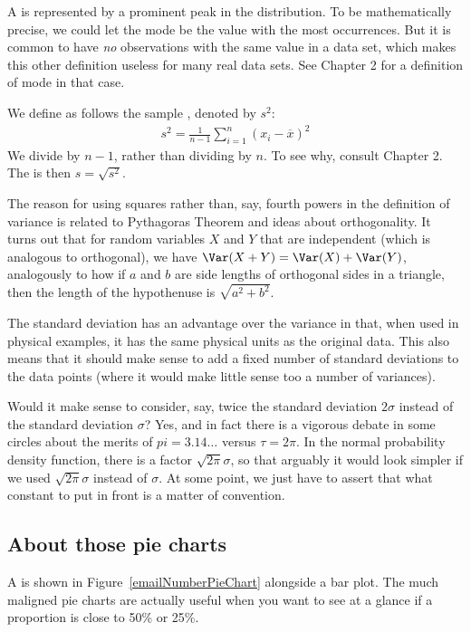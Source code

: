 A  is represented by a prominent peak in the distribution. To be mathematically precise, we could let the mode be the value with the most occurrences. But it is common to have \emph{no} observations with the same value in a data set, which makes this other definition useless for many real data sets. See Chapter 2 for a definition of mode in that case.

\label{variability}

We define as follows the sample \label{varianceIsDefined}, denoted by $s_{}^2$:
\begin{align*}
s_{}^2 = \frac1{n-1}\sum_{i=1}^n (x_i-\overline x)^2
\end{align*}
We divide by $n-1$, rather than dividing by $n$. To see why, consult Chapter 2. The  is then $s=\sqrt{s^2}$.

The reason for using squares rather than, say, fourth powers in the definition of variance is related to Pythagoras Theorem and ideas about orthogonality.
It turns out that for random variables $X$ and $Y$ that are independent (which is analogous to orthogonal), we have $\Var(X+Y)=\Var(X)+\Var(Y)$, analogously to how if $a$ and $b$ are side lengths of orthogonal sides in a triangle, then the length of the hypothenuse is $\sqrt{a^2+b^2}$.

The standard deviation has an advantage over the variance in that, when used in physical examples, it has the same physical units as the original data. This also means that it should make sense to add a fixed number of standard deviations to the data points (where it would make little sense too a number of variances).

Would it make sense to consider, say, twice the standard deviation $2\sigma$ instead of the standard deviation $\sigma$? Yes, and in fact there is a vigorous debate in some circles about the merits of $pi=3.14\dots$ versus $\tau=2\pi$. In the normal probability density function, there is a factor $\sqrt{2\pi}\sigma$, so that arguably it would look simpler if we used $\sqrt{2\pi}\sigma$ instead of $\sigma$. At some point, we just have to assert that what constant to put in front is a matter of convention.

\subsection{About those pie charts}
A  is shown in Figure~\vref{emailNumberPieChart} alongside a bar plot.
The much maligned pie charts are actually useful when you want to see at a glance if a proportion is close to 50\% or 25\%.

